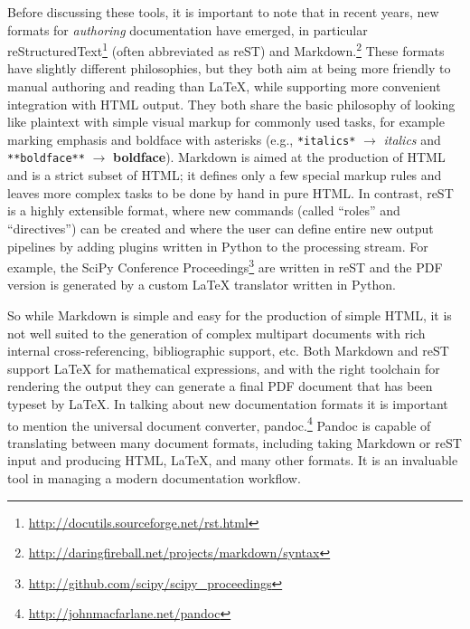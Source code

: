 \documentclass[11pt,oneside,english]{article}
\begin{document}
Before discussing these tools, it is important to note that in recent years,
new formats for \emph{authoring} documentation have emerged, in particular
reStructuredText\footnote{\url{http://docutils.sourceforge.net/rst.html}}
(often abbreviated as reST) and
Markdown.\footnote{\url{http://daringfireball.net/projects/markdown/syntax}}
These formats have slightly different philosophies, but they both aim at being
more friendly to manual authoring and reading than \LaTeX{}, while supporting
more convenient integration with HTML output.  They both share the basic
philosophy of looking like plaintext with simple visual markup for
commonly used tasks, for example marking emphasis and boldface with asterisks
(e.g., \texttt{*italics*} $\rightarrow$ \emph{italics} and
\texttt{**boldface**} $\rightarrow$ \textbf{boldface}).  Markdown is aimed at
the production of HTML and is a strict subset of HTML; it defines only a few
special markup rules and leaves more complex tasks to be done by hand in pure
HTML.  In contrast, reST is a highly extensible format, where new commands
(called ``roles'' and ``directives'') can be created and where the user can
define entire new output pipelines by adding plugins written in Python to the
processing stream. For example, the SciPy Conference
Proceedings\footnote{\url{http://github.com/scipy/scipy_proceedings}} are
written in reST and the PDF version is generated by a custom \LaTeX{}
translator written in Python.

So while Markdown is simple and easy for the production of simple HTML, it
is not well suited to the generation of complex multipart documents with rich
internal cross-referencing, bibliographic support, etc.  Both Markdown and reST
support \LaTeX{} for mathematical expressions, and with the right toolchain for
rendering the output they can generate a final PDF document that has been
typeset by \LaTeX{}.  In talking about new documentation formats it is
important to mention the universal document converter,
pandoc.\footnote{\url{http://johnmacfarlane.net/pandoc}} Pandoc is capable of
translating between many document formats, including taking Markdown or reST
input and producing HTML, \LaTeX{}, and many other formats.  It is an
invaluable tool in managing a modern documentation workflow.
\end{document}

